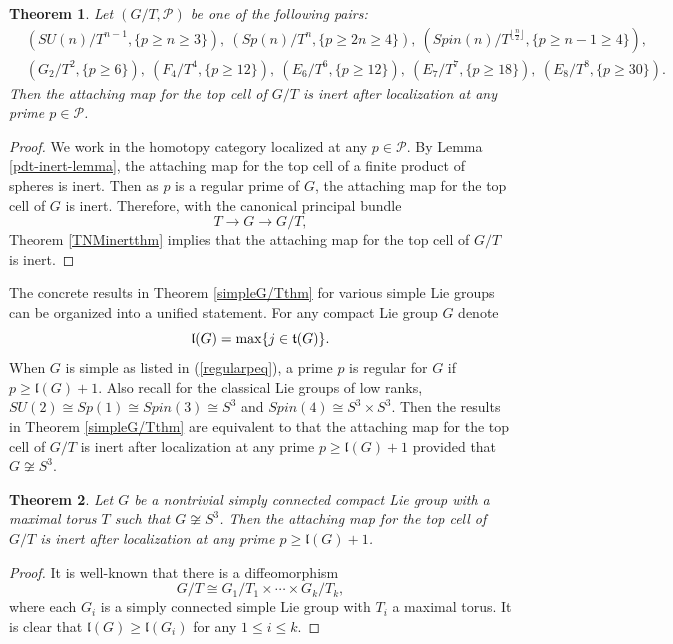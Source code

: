 \documentclass[a4]{amsart}
\newtheorem{theorem}{Theorem}[section]
\theoremstyle{definition}
\begin{document}
\begin{sloppypar}
\begin{theorem}
Let $(G/T, \mathcal{P})$ be one of the following pairs:  
\[
\begin{split}
&(SU(n)/T^{n-1}, \{p\geq n\geq 3\}),   \ (Sp(n)/T^{n}, \{p\geq 2n\geq 4\}),   \ (Spin(n)/T^{\lfloor \frac{n}{2} \rfloor}, \{p\geq n-1\geq 4\}),   \ \\
&(G_2/T^{2}, \{p\geq 6\}), \  (F_4/T^{4}, \{p\geq 12\}),   \ 
(E_6/T^{6}, \{p\geq 12\}),  \  (E_7/T^{7}, \{p\geq 18\}),  \ (E_8/T^{8}, \{p\geq 30\}).
\end{split}
\]
Then the attaching map for the top cell of $G/T$ is inert after localization at any prime $p\in \mathcal{P}$.
\end{theorem}
\begin{proof}
We work in the homotopy category localized at any $p\in \mathcal{P}$. By Lemma \ref{pdt-inert-lemma}, the attaching map for the top cell of a finite product of spheres is inert. Then as $p$ is a regular prime of $G$, the attaching map for the top cell of $G$ is inert. Therefore, with the canonical principal bundle
\[
T\stackrel{}{\longrightarrow} G\stackrel{}{\longrightarrow}G/T, 
\]
Theorem \ref{TNMinertthm} implies that the attaching map for the top cell of $G/T$ is inert.
\end{proof}

The concrete results in Theorem \ref{simpleG/Tthm} for various simple Lie groups can be organized into a unified statement. For any compact Lie group $G$ denote
\[
\mathfrak{l}(G)={\rm max}\{j\in \mathfrak{t}(G)\}. 
\]
When $G$ is simple as listed in (\ref{regularpeq}), a prime $p$ is regular for $G$ if $p\geq  \mathfrak{l}(G)+1$. Also recall for the classical Lie groups of low ranks, $SU(2)\cong Sp(1)\cong Spin(3)\cong S^3$ and $Spin(4)\cong S^3\times S^3$. 
Then the results in Theorem \ref{simpleG/Tthm} are equivalent to that the attaching map for the top cell of $G/T$ is inert after localization at any prime $p\geq  \mathfrak{l}(G)+1$ provided that $G\not\cong S^3$. 
\begin{theorem}\label{G/Tthm}
Let $G$ be a nontrivial simply connected compact Lie group with a maximal torus $T$ such that $G\not\cong S^3$. Then the attaching map for the top cell of $G/T$ is inert after localization at any prime $p\geq  \mathfrak{l}(G)+1$. 
\end{theorem}
\begin{proof}
It is well-known that there is a diffeomorphism
\[
G/T\cong G_1/T_1 \times \cdots \times G_k/T_k,
\]
where each $G_i$ is a simply connected simple Lie group with $T_i$ a maximal torus. It is clear that $\mathfrak{l}(G)\geq \mathfrak{l}(G_i)$ for any $1\leq i\leq k$. 


\end{proof}
\end{sloppypar}
\end{document}
